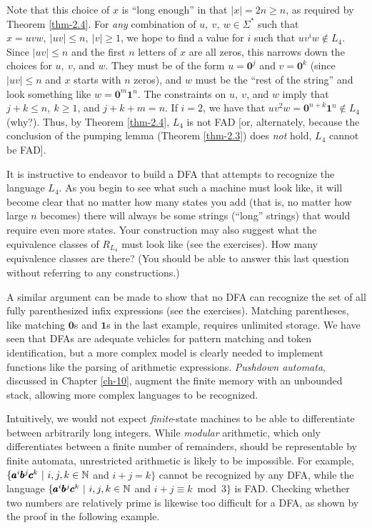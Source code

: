 Note that this choice of $x$ is ``long enough'' in that $|x| = 2n \geq n$, as
required by Theorem \ref{thm-2.4}. For \emph{any} combination of $u,\ v,\ w \in \Sigma^*$ such
that $x = uvw,\ |uv| \leq n,\ |v| \geq 1$, we hope to find a value for $i$ such
that $uv^iw \not \in L_4$. Since $|uv| \leq n$ and the first $n$ letters of $x$ are
all zeros, this narrows down the choices for $u,\ v$, and $w$. They must be of
the form $u = \pmb{0}^j$ and $v = \pmb{0}^k$ (since $|uv| \leq n$ and $x$ starts
with $n$ zeros), and $w$ must be the ``rest of the string'' and look something
like $w=\pmb{0}^m \pmb{1}^n$. The constraints on $u,\ v$, and $w$ imply that
$j + k \leq n,\ k \geq 1$, and $j + k + m = n$. If $i = 2$, we have that
$uv^2w = \pmb{0}^{n+k} \pmb{1}^n \not \in L_4$ (why?). Thus, by Theorem \ref{thm-2.4}, $L_4$ is not FAD
[or, alternately, because the conclusion of the pumping lemma (Theorem \ref{thm-2.3}) does
\emph{not} hold, $L_4$ cannot be FAD].

It is instructive to endeavor to build a DFA that attempts to recognize the
language $L_4$. As you begin to see what such a machine must look like, it
will become clear that no matter how many states you add (that is, no matter how
large $n$ becomes) there will always be some strings (``long'' strings) that
would require even more states. Your construction may also suggest what the
equivalence classes of $R_{L_4}$ must look like (see the exercises). How many
equivalence classes are there? (You should be able to answer this last question
without referring to any constructions.)

A similar argument can be made to show that no DFA can recognize the set of all
fully parenthesized infix expressions (see the exercises). Matching parentheses,
like matching $\pmb{0}$s and $\pmb{1}$s in the last example, requires unlimited
storage. We have seen that DFAs are adequate vehicles for pattern matching and
token identification, but a more complex model is clearly needed to implement
functions like the parsing of arithmetic expressions. \emph{Pushdown automata}, discussed in Chapter \ref{ch-10}, augment the finite memory with an unbounded
stack, allowing more complex languages to be recognized.

Intuitively, we would not expect \emph{finite}-state machines to be able to
differentiate between arbitrarily long integers. While \emph{modular}
arithmetic, which only differentiates between a finite number of remainders,
should be representable by finite automata, unrestricted arithmetic is likely to
be impossible. For example, $\{\pmb{a}^i\pmb{b}^j\pmb{c}^k\ |\ i,j,k \in \mathbb{N}$ and
$i + j = k\}$ cannot be recognized by any DFA, while the language
$\{\pmb{a}^i\pmb{b}^j\pmb{c}^k\ |\ i,j,k \in \mathbb{N}$ and $i + j \equiv k \bmod{3}\}$ is
FAD. Checking whether two numbers are relatively prime is likewise too difficult
for a DFA, as shown by the proof in the following example.

